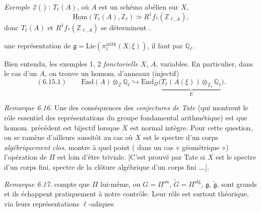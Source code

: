 \documentclass[11pt,a4paper]{article}
\begin{document}
\emph{Exemple 2} ( ) : $T_\ell(A)$, où $A$
est un schéma abélien sur $X$, 
\[
  \underline{\mathrm{Hom}}(T_\ell(A), \mathbb{Z}_\ell) \simeq R^{1}f_*(\mathbb{Z}_{\ell,A}),
\]
donc $T_\ell(A)$ et $R^{1}f_*(\mathbb{Z}_{\ell,A})$ se déterminent .
\struck{\ill{}}

  \struck{\ill{}}  
une représentation de $\mathfrak{g} = \mathrm{Lie}(\pi_1^{\mathrm{arith}}(X;\xi))$, il faut
    par
$\mathbb{Q}_\ell$.

Bien entendu, les exemples 1, 2   
 \emph{fonctorielle}  $X$,  $A$,
variables. En particulier, dans le cas d'un $A$, on trouve un homom. d'anneaux
(injectif)
\[
  (6.15.1)\qquad \mathrm{End}(A) \otimes_{\mathbb{Z}} \mathbb{Q}_\ell \hookrightarrow
  \mathrm{End}_{\Pi}\bigl(\underbrace{T_\ell(A(\xi)) \otimes_{\mathbb{Z}_\ell} \mathbb{Q}_\ell}_{E}\bigr) .
\]

\emph{Remarque 6.16}. Une des conséquences des \emph{conjectures de Tate}
(qui montrent le rôle essentiel des représentations \uncertain{\ill{}} du groupe
fondamental \struck{\ill{}} arithmétique) est que  homom. précédent
est bijectif \struck{\ill{}} lorsque $X$ est normal intègre. Pour cette question,
on se ramène d'ailleurs aussitôt au cas où $X$ est le spectre d'un corps
\emph{algébriquement clos}.  montre à quel point (
dans un cas  « géométrique ») l'opération de $\Pi$ est loin d'être
triviale. [C'est prouvé par Tate si $X$ est le spectre d'un corps fini,
  
  spectre de la clôture algébrique d'un corps fini ….].

\emph{Remarque 6.17}.    compte que
$\Pi$ lui-même, ou $G = \Pi^{\mathrm{an}}$, $\widetilde{G} = \Pi^{\mathrm{alg}}$,
$\mathfrak{g}$, $\widetilde{\mathfrak{g}}$, sont  grands et ils
échappent pratiquement à notre contrôle. Leur rôle est surtout théorique, via
leurs représentations $\ell$-adiques
\end{document}
